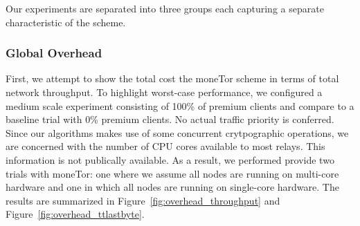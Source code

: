 Our experiments are separated into three groups each capturing a separate
characteristic of the scheme.

\subsubsection{Global Overhead}

First, we attempt to show the total cost the moneTor scheme in terms of total
network throughput. To highlight worst-case performance, we configured a medium
scale experiment consisting of 100\% of premium clients and compare to a
baseline trial with 0\% premium clients. No actual traffic priority is
conferred. Since our algorithms makes use of some concurrent crytpographic
operations, we are concerned with the number of CPU cores available to most
relays. This information is not publically available. As a result, we performed
provide two trials with moneTor: one where we assume all nodes are running on
multi-core hardware and one in which all nodes are running on single-core
hardware. The results are summarized in Figure~\ref{fig:overhead_throughput} and
Figure~\ref{fig:overhead_ttlastbyte}.

